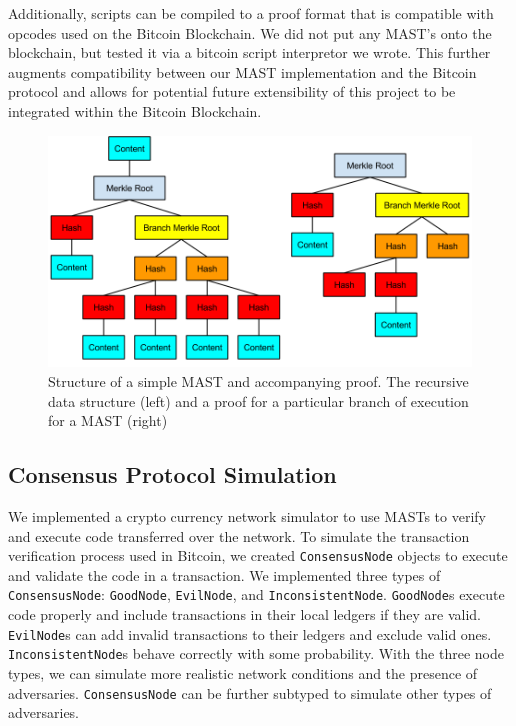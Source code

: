 \documentclass{vldb}
\begin{document}
Additionally, scripts can be compiled to a proof format that is compatible with
opcodes used on the Bitcoin Blockchain. We did not put any MAST's onto the blockchain, but tested it
via a bitcoin script interpretor we wrote. This further augments compatibility between our
MAST implementation and the Bitcoin protocol and allows for potential future
extensibility of this project to be integrated within the Bitcoin Blockchain.

\begin{figure}[h]
	\includegraphics[scale=.35]{mast}
	\caption{Structure of a simple MAST and accompanying proof. The recursive data structure (left) and a proof for a particular branch of execution for a MAST (right)}
	\label{system}
\end{figure}

\subsection{Consensus Protocol Simulation}

We implemented a crypto currency network simulator to use MASTs to verify and
execute code transferred over the network. To simulate the transaction
verification process used in Bitcoin, we created \texttt{ConsensusNode} objects to
execute and validate the code in a transaction. We implemented three types
of \texttt{ConsensusNode}: \texttt{GoodNode}, \texttt{EvilNode}, and
\texttt{InconsistentNode}. \texttt{GoodNode}s execute code properly and
include transactions in their local ledgers if they are valid.
\texttt{EvilNode}s can add invalid transactions to their
ledgers and exclude valid ones. \texttt{InconsistentNode}s behave correctly with some
probability. With the three node types, we can simulate more realistic network
conditions and the presence of adversaries. \texttt{ConsensusNode} can be further
subtyped to simulate other types of adversaries.
\end{document}
